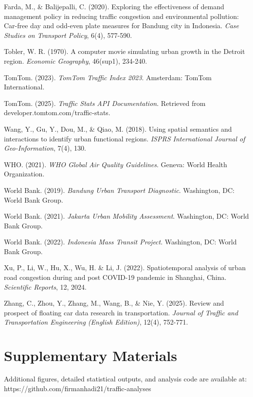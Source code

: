 \documentclass[12pt,a4paper]{article}
\begin{document}
Farda, M., \& Balijepalli, C. (2020). Exploring the effectiveness of demand management policy in reducing traffic congestion and environmental pollution: Car-free day and odd-even plate measures for Bandung city in Indonesia. \emph{Case Studies on Transport Policy}, 6(4), 577-590.

Tobler, W. R. (1970). A computer movie simulating urban growth in the Detroit region. \emph{Economic Geography}, 46(sup1), 234-240.

TomTom. (2023). \emph{TomTom Traffic Index 2023}. Amsterdam: TomTom International.

TomTom. (2025). \emph{Traffic Stats API Documentation}. Retrieved from developer.tomtom.com/traffic-stats.

Wang, Y., Gu, Y., Dou, M., \& Qiao, M. (2018). Using spatial semantics and interactions to identify urban functional regions. \emph{ISPRS International Journal of Geo-Information}, 7(4), 130.

WHO. (2021). \emph{WHO Global Air Quality Guidelines}. Geneva: World Health Organization.

World Bank. (2019). \emph{Bandung Urban Transport Diagnostic}. Washington, DC: World Bank Group.

World Bank. (2021). \emph{Jakarta Urban Mobility Assessment}. Washington, DC: World Bank Group.

World Bank. (2022). \emph{Indonesia Mass Transit Project}. Washington, DC: World Bank Group.

Xu, P., Li, W., Hu, X., Wu, H. \& Li, J. (2022). Spatiotemporal analysis of urban road congestion during and post COVID-19 pandemic in Shanghai, China. \emph{Scientific Reports}, 12, 2024.

Zhang, C., Zhou, Y., Zhang, M., Wang, B., \& Nie, Y. (2025). Review and prospect of floating car data research in transportation. \emph{Journal of Traffic and Transportation Engineering (English Edition)}, 12(4), 752-771.




\section*{Supplementary Materials}

Additional figures, detailed statistical outputs, and analysis code are available at: https://github.com/firmanhadi21/traffic-analyses
\end{document}
